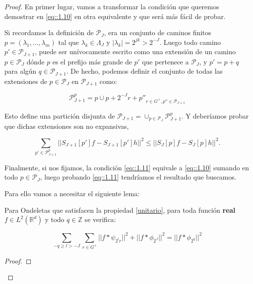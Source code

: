 \begin{proof}

\noindent En primer lugar, vamos a transformar la condición que queremos demostrar en \eqref{eq::1.10} en otra equivalente y que será más fácil de probar.

\medskip

\noindent Si recordamos la definición de $\mathcal{P}_J$, era un conjunto de caminos finitos $p=(\lambda_1,...,\lambda_m)$ tal que $\lambda_k\in\Lambda_J$ y $|\lambda_k|=2^{jk}>2^{-J}$. Luego todo camino $p' \in \mathcal{P}_{J+1}$, puede ser unívocamente escrito como una extensión de un camino $p\in \mathcal{P}_J$ dónde $p$ es el prefijo más grande de $p'$ que pertenece a $\mathcal{P}_J$, y $p'=p+q$ para algún $q\in \mathcal{P}_{J+1}$. De hecho, podemos definir el conjunto de todas las extensiones de $p\in \mathcal{P}_J$ en $\mathcal{P}_{J+1}$ como: 

\begin{equation}
  \mathcal{P}_{J+1}^{p}={p} \cup {p+2^{-J}r+p''}_{r\in G^{+},p''\in \mathcal{P}_{J+1}}
\end{equation}

Esto define una partición disjunta de $\mathcal{P}_{J+1}=\cup_{p \in \mathcal{P}_J} \mathcal{P}_{J+1}^{p}$. Y deberíamos probar que dichas extensiones son no expansivas,

\begin{equation}\label{eq::1.11}
  \sum_{p' \in \mathcal{P}_{J+1}^p} || S_{J+1}[p']f-S_{J+1}[p']h||^2 \leq ||S_{J}[p]f-S_J [p]h||^2.
\end{equation}

\noindent Finalmente, si nos fijamos, la condición \eqref{eq::1.11} equivale a \eqref{eq::1.10} sumando en todo $p\in \mathcal{P}_J$, luego probando \eqref{eq::1.11} tendríamos el resultado que buscamos. 


\medskip


\noindent Para ello vamos a necesitar el siguiente lema:

\begin{lema}
  Para Ondeletas que satisfacen la propiedad \autoref{unitario}, para toda función \textbf{real} $f\in L^2(\mathbb{R}^d)$ y todo $q \in \mathbb{Z}$ se verifica: 

  $$\sum_{-q\geq l > -J} \sum_{r \in G^+} || f \ast \psi_{2^lr}||^2 + || f \ast \phi_{2^J}||^2 = || f \ast \phi_{2^q} ||^2$$

\end{lema}

\begin{proof}


\end{proof}
\end{proof}
